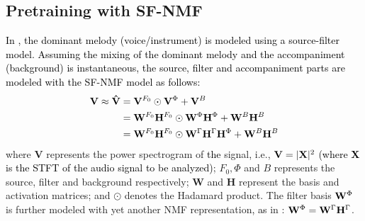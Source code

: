 \documentclass{article}
\newcommand{\db}[1]{{\textcolor{black}{#1}}}
\newcommand{\jb}[1]{{\textcolor{black}{#1}}}
\begin{document}
   


\subsection{Pretraining with SF-NMF} \label{subsec:Pretraining}
\db{In \cite{Durrieu}, the dominant melody (voice/instrument) is modeled using a source-filter model. Assuming the mixing of the dominant melody and the accompaniment (background) is instantaneous, the source, filter and accompaniment parts are modeled with \db{the SF-NMF} model as follows:}
\begin{align}	
    \mathbf{V} \approx \mathbf{\hat{V}} &= \mathbf{V}^{F_0} \odot \mathbf{V}^{\Phi} + \mathbf{V}^{B} \nonumber \\
    \label{eqn:SF-Model-IMM}
    &=\mathbf{W}^{F_{0}}\mathbf{H}^{F_{0}} \odot \mathbf{W}^{\Phi}\mathbf{H}^{\Phi} + \mathbf{W}^{B}\mathbf{H}^{B} \\
    \label{eqn:SF-Model-SIMM}
    &=\mathbf{W}^{F_{0}}\mathbf{H}^{F_{0}} \odot \mathbf{W}^{\Gamma}\mathbf{H}^{\Gamma}\mathbf{H}^{\Phi} + \mathbf{W}^{B}\mathbf{H}^{B} 
\end{align}
where $\mathbf{V}$ represents the power spectrogram of \jb{the} signal,
i.e., $\mathbf{V} = |\mathbf{X}|^2$ \jb{(}\db{where $\mathbf{X}$ is the STFT of the audio signal to be analyzed}\jb{)}; 
$F_0, \Phi$ and $B$ represents the source, filter and background respectively; $\mathbf{W}$ and $\mathbf{H}$ represent the basis and activation matrices; and $\odot$ denotes the Hadamard product. 
The filter basis $\mathbf{W}^{\Phi}$ is further modeled with yet another NMF representation\jb{, as} in \cite{Durrieu-2}: $\mathbf{W}^{\Phi} = \mathbf{W}^{\Gamma} \mathbf{H}^{\Gamma}$. 
\end{document}

